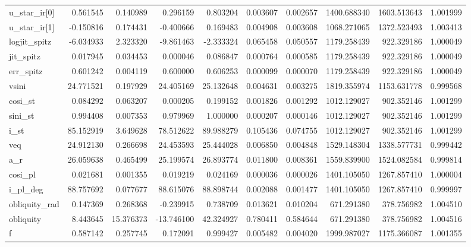 \begin{tabular}{lrrrrrrrrr}
u\_star\_ir[0]  &   0.561545 &   0.140989 &   0.296159 &    0.803204 &   0.003607 &  0.002657 &  1400.688340 &  1603.513643 &  1.001999 \\
u\_star\_ir[1]  &  -0.150816 &   0.174431 &  -0.400666 &    0.169483 &   0.004908 &  0.003608 &  1068.271065 &  1372.523493 &  1.003413 \\
logjit\_spitz  &  -6.034933 &   2.323320 &  -9.861463 &   -2.333324 &   0.065458 &  0.050557 &  1179.258439 &   922.329186 &  1.000049 \\
jit\_spitz     &   0.017945 &   0.034453 &   0.000046 &    0.086847 &   0.000764 &  0.000585 &  1179.258439 &   922.329186 &  1.000049 \\
err\_spitz     &   0.601242 &   0.004119 &   0.600000 &    0.606253 &   0.000099 &  0.000070 &  1179.258439 &   922.329186 &  1.000049 \\
vsini         &  24.771521 &   0.197929 &  24.405169 &   25.132648 &   0.004631 &  0.003275 &  1819.355974 &  1153.631778 &  0.999568 \\
cosi\_st       &   0.084292 &   0.063207 &   0.000205 &    0.199152 &   0.001826 &  0.001292 &  1012.129027 &   902.352146 &  1.001299 \\
sini\_st       &   0.994408 &   0.007353 &   0.979969 &    1.000000 &   0.000207 &  0.000146 &  1012.129027 &   902.352146 &  1.001299 \\
i\_st          &  85.152919 &   3.649628 &  78.512622 &   89.988279 &   0.105436 &  0.074755 &  1012.129027 &   902.352146 &  1.001299 \\
veq           &  24.912130 &   0.266698 &  24.453593 &   25.444028 &   0.006850 &  0.004848 &  1529.148304 &  1338.577731 &  0.999442 \\
a\_r           &  26.059638 &   0.465499 &  25.199574 &   26.893774 &   0.011800 &  0.008361 &  1559.839900 &  1524.082584 &  0.999814 \\
cosi\_pl       &   0.021681 &   0.001355 &   0.019219 &    0.024169 &   0.000036 &  0.000026 &  1401.105050 &  1267.857410 &  1.000004 \\
i\_pl\_deg      &  88.757692 &   0.077677 &  88.615076 &   88.898744 &   0.002088 &  0.001477 &  1401.105050 &  1267.857410 &  0.999997 \\
obliquity\_rad &   0.147369 &   0.268368 &  -0.239915 &    0.738709 &   0.013621 &  0.010204 &   671.291380 &   378.756982 &  1.004510 \\
obliquity     &   8.443645 &  15.376373 & -13.746100 &   42.324927 &   0.780411 &  0.584644 &   671.291380 &   378.756982 &  1.004516 \\
f             &   0.587142 &   0.257745 &   0.172091 &    0.999427 &   0.005482 &  0.004020 &  1999.987027 &  1175.366087 &  1.001355 \\
\bottomrule
\end{tabular}
